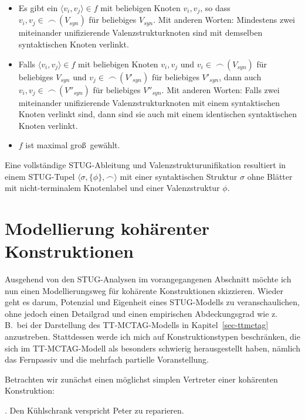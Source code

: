 \begin{itemize}
  \item Es gibt ein $\langle v_i,v_j \rangle \in f$ mit beliebigen Knoten $v_i,v_j$, so dass $v_i,v_j \in \; \frown\,(V_{syn})$ für beliebiges $V_{syn}$. Mit anderen Worten: Mindestens zwei miteinander unifizierende Valenzstrukturknoten sind mit demselben syntaktischen Knoten verlinkt.
  \item Falls $\langle v_i,v_j \rangle \in f$ mit beliebigen Knoten $v_i,v_j$ und $v_i \in \; \frown\,(V_{syn})$ für beliebiges $V_{syn}$ und $v_j \in \; \frown\,(V'_{syn})$ für beliebiges $V'_{syn}$, dann auch $v_i,v_j \in \; \frown\,(V''_{syn})$ für beliebiges $V''_{syn}$. Mit anderen Worten: Falls zwei miteinander unifizierende Valenzstrukturknoten mit einem syntaktischen Knoten verlinkt sind, dann sind sie auch mit einem identischen syntaktischen Knoten verlinkt.
  \item $f$ ist maximal gro\ss\ gewählt.
\end{itemize}

Eine vollständige STUG-Ableitung und Valenzstrukturunifikation resultiert in einem STUG-Tupel $\langle \sigma, \{\phi\}, \frown \rangle$ mit einer syntaktischen Struktur $\sigma$ ohne Blätter mit nicht-termina\-lem Knotenlabel und einer Valenzstruktur $\phi$. 

\section{Modellierung kohärenter Konstruktionen} \label{sec-stug-kohaerenz}

Ausgehend von den STUG-Analysen im vorangegangenen Abschnitt möchte ich nun einen Modellierungsweg für kohärente Konstruktionen skizzieren. Wieder geht es darum, Potenzial und Eigenheit eines STUG-Modells zu veranschaulichen, ohne jedoch einen Detailgrad und einen empirischen Abdeckungsgrad wie z.\,B.\ bei der Darstellung des TT-MCTAG-Modells in Kapitel~\ref{sec-ttmctag} anzustreben. Stattdessen werde ich mich auf Konstruktionstypen beschränken, die sich im TT-MCTAG-Modell als besonders schwierig herausgestellt haben, nämlich das Fernpassiv und die mehrfach partielle Voranstellung.

Betrachten wir zunächst einen möglichst simplen Vertreter einer kohärenten Konstruktion: 

\ex. \label{ex-stug-5} Den Kühlschrank verspricht Peter zu reparieren.

